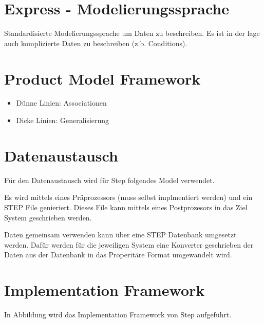 \section{Express - Modelierungssprache}

Standardisierte Modelierungssprache um Daten zu beschreiben. Es ist in der lage auch komplizierte Daten zu beschreiben (z.b. Conditions).

\newpage\section{Product Model Framework}

\begin{itemize}
\item Dünne Linien: Associationen
\item Dicke Linien: Generalisierung
\end{itemize}


\section{Datenaustausch}

Für den Datenaustausch wird für Step folgendes Model verwendet.


Es wird mittels eines Präprozessors (muss selbst implmentiert werden) und ein STEP File genieriert. Dieses File kann mittels eines Postprozesors in das Ziel System geschrieben werden.


Daten gemeinsam verwenden kann über eine STEP Datenbank umgesetzt werden. Dafür werden für die jeweiligen System eine Konverter geschrieben der Daten aus der Datenbank in das Properitäre Format umgewandelt wird.

\newpage\section{Implementation Framework}

In Abbildung  wird das Implementation Framework von Step aufgeführt.


